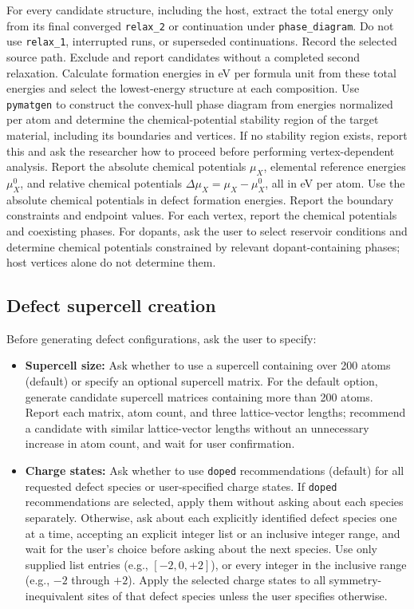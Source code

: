 \documentclass[aip,jap,reprint,amsmath,amssymb]{revtex4-2}
\begin{document}
For every candidate structure, including the host, extract the total energy only from its final converged \texttt{relax\_2} or continuation under \texttt{phase\_diagram}. Do not use \texttt{relax\_1}, interrupted runs, or superseded continuations. Record the selected source path. Exclude and report candidates without a completed second relaxation. Calculate formation energies in eV per formula unit from these total energies and select the lowest-energy structure at each composition. Use \texttt{pymatgen} to construct the convex-hull phase diagram from energies normalized per atom and determine the chemical-potential stability region of the target material, including its boundaries and vertices.\cite{Chen2013} If no stability region exists, report this and ask the researcher how to proceed before performing vertex-dependent analysis. Report the absolute chemical potentials $\mu_X$, elemental reference energies $\mu_X^0$, and relative chemical potentials $\Delta\mu_X = \mu_X - \mu_X^0$, all in eV per atom. Use the absolute chemical potentials in defect formation energies. Report the boundary constraints and endpoint values. For each vertex, report the chemical potentials and coexisting phases. For dopants, ask the user to select reservoir conditions and determine chemical potentials constrained by relevant dopant-containing phases; host vertices alone do not determine them.

\subsection{Defect supercell creation}

Before generating defect configurations, ask the user to specify:
\begin{itemize}
    \item \textbf{Supercell size:} Ask whether to use a supercell containing over 200 atoms (default) or specify an optional supercell matrix. For the default option, generate candidate supercell matrices containing more than 200 atoms. Report each matrix, atom count, and three lattice-vector lengths; recommend a candidate with similar lattice-vector lengths without an unnecessary increase in atom count, and wait for user confirmation.
    \item \textbf{Charge states:} Ask whether to use \texttt{doped} recommendations (default) for all requested defect species or user-specified charge states. If \texttt{doped} recommendations are selected, apply them without asking about each species separately. Otherwise, ask about each explicitly identified defect species one at a time, accepting an explicit integer list or an inclusive integer range, and wait for the user's choice before asking about the next species. Use only supplied list entries (e.g., $[-2,0,+2]$), or every integer in the inclusive range (e.g., $-2$ through $+2$). Apply the selected charge states to all symmetry-inequivalent sites of that defect species unless the user specifies otherwise.
\end{itemize}
\end{document}
